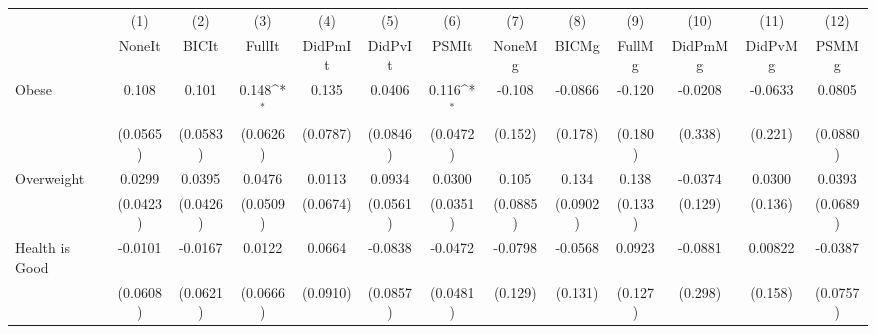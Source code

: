 {
\def\sym#1{\ifmmode^{#1}\else\(^{#1}\)\fi}
\begin{tabular}{l*{12}{c}}
\toprule
            &\multicolumn{1}{c}{(1)}&\multicolumn{1}{c}{(2)}&\multicolumn{1}{c}{(3)}&\multicolumn{1}{c}{(4)}&\multicolumn{1}{c}{(5)}&\multicolumn{1}{c}{(6)}&\multicolumn{1}{c}{(7)}&\multicolumn{1}{c}{(8)}&\multicolumn{1}{c}{(9)}&\multicolumn{1}{c}{(10)}&\multicolumn{1}{c}{(11)}&\multicolumn{1}{c}{(12)}\\
            &\multicolumn{1}{c}{NoneIt}&\multicolumn{1}{c}{BICIt}&\multicolumn{1}{c}{FullIt}&\multicolumn{1}{c}{DidPmIt}&\multicolumn{1}{c}{DidPvIt}&\multicolumn{1}{c}{PSMIt}&\multicolumn{1}{c}{NoneMg}&\multicolumn{1}{c}{BICMg}&\multicolumn{1}{c}{FullMg}&\multicolumn{1}{c}{DidPmMg}&\multicolumn{1}{c}{DidPvMg}&\multicolumn{1}{c}{PSMMg}\\
\midrule
Obese       &       0.108         &       0.101         &       0.148\sym{*}  &       0.135         &      0.0406         &       0.116\sym{*}  &      -0.108         &     -0.0866         &      -0.120         &     -0.0208         &     -0.0633         &      0.0805         \\
            &    (0.0565)         &    (0.0583)         &    (0.0626)         &    (0.0787)         &    (0.0846)         &    (0.0472)         &     (0.152)         &     (0.178)         &     (0.180)         &     (0.338)         &     (0.221)         &    (0.0880)         \\
\addlinespace
Overweight  &      0.0299         &      0.0395         &      0.0476         &      0.0113         &      0.0934         &      0.0300         &       0.105         &       0.134         &       0.138         &     -0.0374         &      0.0300         &      0.0393         \\
            &    (0.0423)         &    (0.0426)         &    (0.0509)         &    (0.0674)         &    (0.0561)         &    (0.0351)         &    (0.0885)         &    (0.0902)         &     (0.133)         &     (0.129)         &     (0.136)         &    (0.0689)         \\
\addlinespace
Health is Good&     -0.0101         &     -0.0167         &      0.0122         &      0.0664         &     -0.0838         &     -0.0472         &     -0.0798         &     -0.0568         &      0.0923         &     -0.0881         &     0.00822         &     -0.0387         \\
            &    (0.0608)         &    (0.0621)         &    (0.0666)         &    (0.0910)         &    (0.0857)         &    (0.0481)         &     (0.129)         &     (0.131)         &     (0.127)         &     (0.298)         &     (0.158)         &    (0.0757)         \\

\end{tabular}}
